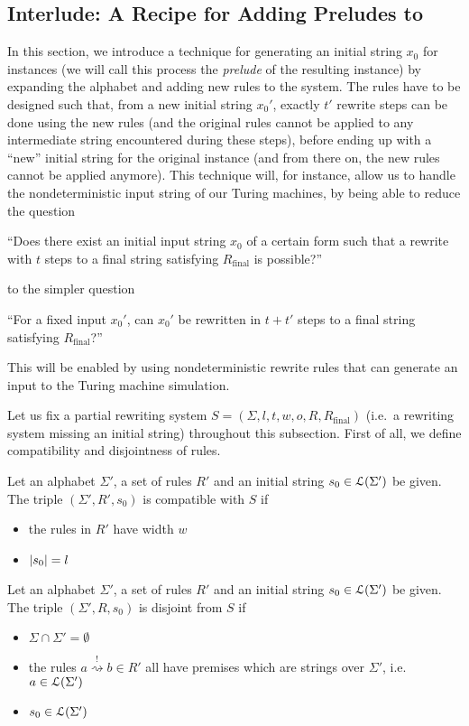 \documentclass[a4paper,UKenglish,cleveref, autoref]{lipics-v2019}
\newcommand{\constrent}{\overset{!}{\rightsquigarrow}}
\newcommand{\Rfinal}{R_{\text{final}}}
\begin{document}
\subsection{Interlude: A Recipe for Adding Preludes to \strconrew{}}
In this section, we introduce a technique for generating an initial string $x_0$ for \strconrew{} instances (we will call this process the \emph{prelude} of the resulting \strconrew{} instance) by expanding the alphabet and adding new rules to the system. The rules have to be designed such that, from a new initial string $x_0'$, exactly $t'$ rewrite steps can be done using the new rules (and the original rules cannot be applied to any intermediate string encountered during these steps), before ending up with a ``new'' initial string for the original \strconrew{} instance (and from there on, the new rules cannot be applied anymore). 
This technique will, for instance, allow us to handle the nondeterministic input string of our Turing machines, by being able to reduce the question
\begin{center}
  ``Does there exist an initial input string $x_0$ of a certain form such that a rewrite with $t$ steps to a final string satisfying $\Rfinal$ is possible?''
\end{center}
to the simpler question
\begin{center}
  ``For a fixed input $x_0'$, can $x_0'$ be rewritten in $t + t'$ steps to a final string satisfying $\Rfinal$?''
\end{center}
This will be enabled by using nondeterministic rewrite rules that can generate an input to the Turing machine simulation.

Let us fix a partial rewriting system $S = (\Sigma, l, t, w, o, R, \Rfinal)$ (i.e.\ a rewriting system missing an initial string) throughout this subsection. 
First of all, we define compatibility and disjointness of rules. 
\begin{definition}[Compatibility]
  Let an alphabet $\Sigma'$, a set of rules $R'$ and an initial string $s_0 \in \mathcal{L} (\Sigma')$ be given. 
  The triple $(\Sigma', R', s_0)$ is compatible with $S$ if
  \begin{itemize}
    \item the rules in $R'$ have width $w$
    \item $|s_0| = l$
  \end{itemize}
\end{definition}
\begin{definition}[Disjointness]
  Let an alphabet $\Sigma'$, a set of rules $R'$ and an initial string $s_0 \in \mathcal{L} (\Sigma')$ be given. 
  The triple $(\Sigma', R, s_0)$ is disjoint from $S$ if 
  \begin{itemize}
    \item $\Sigma \cap \Sigma' = \emptyset$
    \item the rules $a \constrent{} b \in  R'$ all have premises which are strings over $\Sigma'$, i.e.\ $a \in \mathcal{L} (\Sigma')$
    \item $s_0 \in \mathcal{L} (\Sigma')$
  \end{itemize}
\end{definition}
\end{document}
